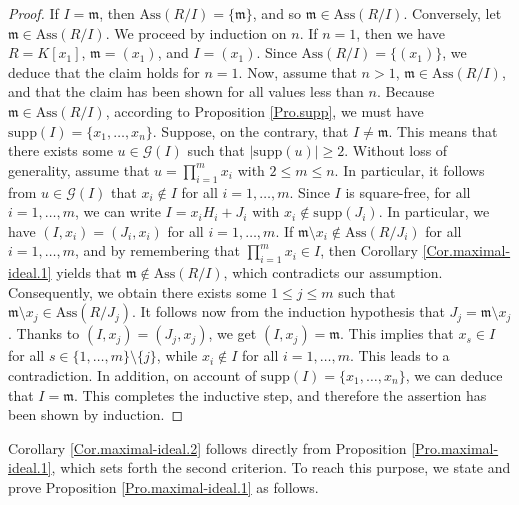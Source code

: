 \documentclass[11pt]{amsart}
\begin{document}
\begin{proof}
If $I=\mathfrak{m}$, then  $\mathrm{Ass}(R/I)=\{\mathfrak{m}\}$, and so $\mathfrak{m} \in \mathrm{Ass}(R/I)$. 
 Conversely, let $\mathfrak{m} \in \mathrm{Ass}(R/I)$.  We proceed by induction on $n$. If $n=1$, then we have $R=K[x_1]$, $\mathfrak{m}=(x_1)$, and 
  $I=(x_1)$. Since $\mathrm{Ass}(R/I)=\{(x_1)\}$, we deduce that the claim holds for $n=1$. 
  Now, assume that $n>1$, $\mathfrak{m} \in \mathrm{Ass}(R/I)$, 
   and that the claim has been shown   for all values less than $n$. Because  $\mathfrak{m} \in \mathrm{Ass}(R/I)$, according to Proposition \ref{Pro.supp}, we must have    $\mathrm{supp}(I)=\{x_1, \ldots, x_n\}$. Suppose, on the contrary, that $I\neq \mathfrak{m}$. This means that there exists some $u\in \mathcal{G}(I)$ 
   such that $|\mathrm{supp}(u)|\geq 2$. Without loss of generality, assume that $u=\prod_{i=1}^m x_i$ with $2\leq m \leq n$. In particular, it follows from $u\in \mathcal{G}(I)$ that    $x_i\notin I$ for all $i=1, \ldots, m$.  Since $I$ is square-free, for all $i=1, \ldots, m$, we can write $I=x_iH_i+ J_i$
    with $x_i\notin \mathrm{supp}(J_i)$.  In particular, we have $(I, x_i)=(J_i, x_i)$ for all $i=1, \ldots, m$. 
    If $\mathfrak{m}\setminus x_i \notin \mathrm{Ass}(R/J_i)$  for all $i=1, \ldots, m$, and by remembering that $\prod_{i=1}^m x_i \in I$, then Corollary 
    \ref{Cor.maximal-ideal.1} yields that $\mathfrak{m}\notin  \mathrm{Ass}(R/I)$, which contradicts our assumption. Consequently, we obtain there exists some 
    $1\leq j \leq m$ such that  $\mathfrak{m}\setminus x_j \in \mathrm{Ass}(R/J_j)$. It follows now from the  induction hypothesis  that $J_j=\mathfrak{m}\setminus x_j$. 
    Thanks to $(I, x_j)=(J_j, x_j)$, we get $(I,x_j)=\mathfrak{m}$. This implies that $x_s\in I$ for all $s\in \{1, \ldots, m\}\setminus \{j\}$, while $x_i\notin I$ for all $i=1, \ldots, m$. 
    This leads to a contradiction. In addition, on account of   $\mathrm{supp}(I)=\{x_1, \ldots, x_n\}$, we can deduce that $I=\mathfrak{m}$. 
    This completes the inductive step, and therefore the assertion  has been shown  by induction.
\end{proof}






Corollary   \ref{Cor.maximal-ideal.2} follows directly from Proposition  \ref{Pro.maximal-ideal.1}, which sets forth the second   criterion. To reach this purpose, we 
state and prove Proposition  \ref{Pro.maximal-ideal.1} as follows.
\end{document}
